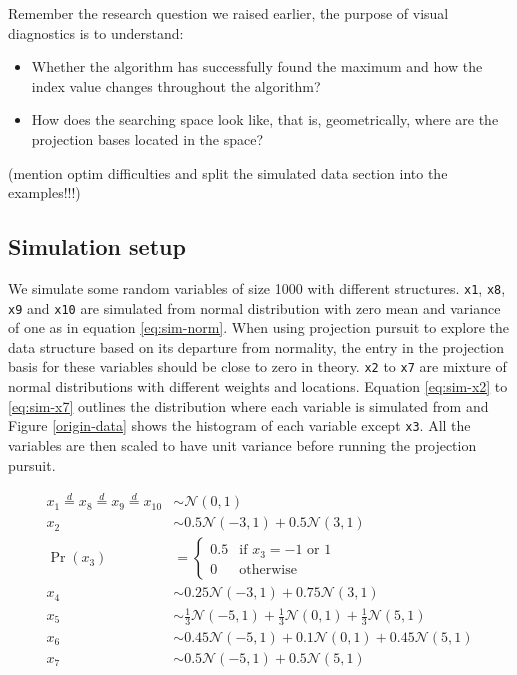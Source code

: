 \documentclass[12pt]{article}
\begin{document}
Remember the research question we raised earlier, the purpose of visual
diagnostics is to understand:

\begin{itemize}
\item
  Whether the algorithm has successfully found the maximum and how the
  index value changes throughout the algorithm?
\item
  How does the searching space look like, that is, geometrically, where
  are the projection bases located in the space?
\end{itemize}

(mention optim difficulties and split the simulated data section into
the examples!!!)

\hypertarget{simulation-setup}{%
\subsection{Simulation setup}\label{simulation-setup}}

We simulate some random variables of size 1000 with different
structures. \texttt{x1}, \texttt{x8}, \texttt{x9} and \texttt{x10} are
simulated from normal distribution with zero mean and variance of one as
in equation \ref{eq:sim-norm}. When using projection pursuit to explore
the data structure based on its departure from normality, the entry in
the projection basis for these variables should be close to zero in
theory. \texttt{x2} to \texttt{x7} are mixture of normal distributions
with different weights and locations. Equation \ref{eq:sim-x2} to
\ref{eq:sim-x7} outlines the distribution where each variable is
simulated from and Figure \ref{origin-data} shows the histogram of each
variable except \texttt{x3}. All the variables are then scaled to have
unit variance before running the projection pursuit.

\begin{align}
x_1 \overset{d}{=} x_8 \overset{d}{=} x_9 \overset{d}{=} x_{10}& \sim \mathcal{N}(0, 1) \label{eq:sim-norm} \\
x_2 &\sim 0.5 \mathcal{N}(-3, 1) + 0.5 \mathcal{N}(3, 1)\label{eq:sim-x2}\\
\Pr(x_3) &= 
\begin{cases}
0.5 & \text{if $x_3 = -1$ or $1$}\\
0 & \text{otherwise}
\end{cases}\label{eq:sim-x3}\\
x_4 &\sim 0.25 \mathcal{N}(-3, 1) + 0.75 \mathcal{N}(3, 1) \label{eq:sim-x4}\\
x_5 &\sim \frac{1}{3} \mathcal{N}(-5, 1) + \frac{1}{3} \mathcal{N}(0, 1) + \frac{1}{3} \mathcal{N}(5, 1)\label{eq:sim-x5}\\
x_6 &\sim 0.45 \mathcal{N}(-5, 1) + 0.1 \mathcal{N}(0, 1) + 0.45 \mathcal{N}(5, 1)\label{eq:sim-x6}\\
x_7 &\sim 0.5 \mathcal{N}(-5, 1) + 0.5 \mathcal{N}(5, 1) 
\label{eq:sim-x7}
\end{align}
\end{document}

